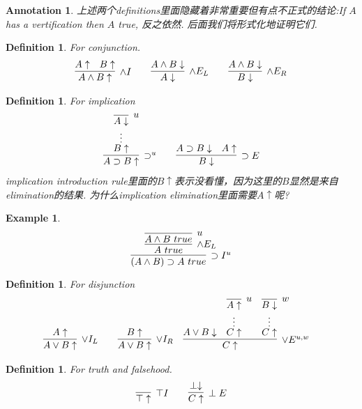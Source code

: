 \documentclass{article}
\theoremstyle{plain}
\newtheorem{example}[theorem]{Example}
\newtheorem{definition}[theorem]{Definition}
\newtheorem{annotation}[theorem]{Annotation}
\theoremstyle{nonumberplain}
\begin{document}
\begin{annotation}
\rm 上述两个definitions里面隐藏着非常重要但有点不正式的结论:If $A$ has a vertification then $A$ true, 反之依然. 后面我们将形式化地证明它们. 
\end{annotation}

\begin{definition}
\rm For conjunction. 
$$
\begin{aligned}
&\infer[\wedge I]{A \wedge B\uparrow}{A \uparrow & B \uparrow} &&& \infer[\wedge E_L]{A \downarrow}{A \wedge B \downarrow} &&&& \infer[\wedge E_R]{B \downarrow}{A \wedge B \downarrow}
\end{aligned}
$$
\end{definition}


\begin{definition}
\rm For implication
$$
\begin{aligned}
&\infer[\supset^u]{A \supset B \uparrow}{\deduce[\vdots]{B\uparrow}{\infer[u]{A\downarrow}{}}} &&& \infer[\supset E]{B \downarrow}{A \supset B \downarrow & A \uparrow}
\end{aligned}
$$
implication introduction rule里面的$B \uparrow$表示没看懂，因为这里的$B$显然是来自elimination的结果. 为什么implication elimination里面需要$A \uparrow$呢?
\end{definition}

\begin{example}
\rm 
$$
\infer[\supset I^u]{(A \wedge B) \supset A~true}{\infer[\wedge E_L]{A~true}{\infer[u]{A\wedge B~true}{}}}
$$
\end{example}


\begin{definition}
\rm For disjunction
$$
\begin{aligned}
&\infer[\vee I_L]{A \vee B \uparrow}{A \uparrow} &&& \infer[\vee I_R]{A \vee B \uparrow}{B \uparrow} &&&  \infer[\vee E^{u,w}]{C \uparrow}{A \vee B \downarrow & \deduce[\vdots]{C\uparrow}{\infer[u]{A\uparrow}{}} & \deduce[\vdots]{C\uparrow}{\infer[w]{B\downarrow}{}}}
\end{aligned}
$$
\end{definition}


\begin{definition}
\rm For truth and falsehood.
$$
\begin{aligned}
& \infer[\top I]{\top \uparrow}{} &&& \infer[\perp E]{C\uparrow}{\perp \downarrow}
\end{aligned}
$$
\end{definition}
\end{document}

